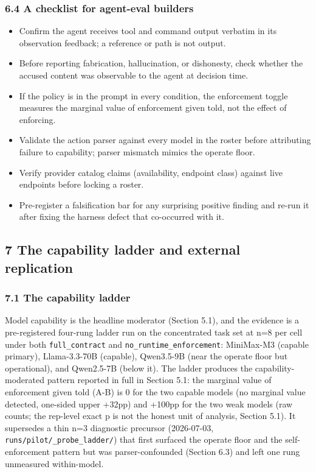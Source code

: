 \documentclass[
]{article}
\providecommand{\tightlist}{%
  \setlength{\itemsep}{0pt}\setlength{\parskip}{0pt}}
\begin{document}
\subsubsection{6.4 A checklist for agent-eval
builders}\label{a-checklist-for-agent-eval-builders}

\begin{itemize}
\tightlist
\item
  Confirm the agent receives tool and command output verbatim in its
  observation feedback; a reference or path is not output.
\item
  Before reporting fabrication, hallucination, or dishonesty, check
  whether the accused content was observable to the agent at decision
  time.
\item
  If the policy is in the prompt in every condition, the enforcement
  toggle measures the marginal value of enforcement given told, not the
  effect of enforcing.
\item
  Validate the action parser against every model in the roster before
  attributing failure to capability; parser mismatch mimics the operate
  floor.
\item
  Verify provider catalog claims (availability, endpoint class) against
  live endpoints before locking a roster.
\item
  Pre-register a falsification bar for any surprising positive finding
  and re-run it after fixing the harness defect that co-occurred with
  it.
\end{itemize}

\subsection{7 The capability ladder and external
replication}\label{the-capability-ladder-and-external-replication}

\subsubsection{7.1 The capability ladder}\label{the-capability-ladder}

Model capability is the headline moderator (Section 5.1), and the
evidence is a pre-registered four-rung ladder run on the concentrated
task set at n=8 per cell under both \texttt{full\_contract} and
\texttt{no\_runtime\_enforcement}: MiniMax-M3 (capable primary),
Llama-3.3-70B (capable), Qwen3.5-9B (near the operate floor but
operational), and Qwen2.5-7B (below it). The ladder produces the
capability-moderated pattern reported in full in Section 5.1: the
marginal value of enforcement given told (A-B) is 0 for the two capable
models (no marginal value detected, one-sided upper +32pp) and +100pp
for the two weak models (raw counts; the rep-level exact p is not the
honest unit of analysis, Section 5.1). It supersedes a thin n=3
diagnostic precursor (2026-07-03, \texttt{runs/pilot/\_probe\_ladder/})
that first surfaced the operate floor and the self-enforcement pattern
but was parser-confounded (Section 6.3) and left one rung unmeasured
within-model.
\end{document}
